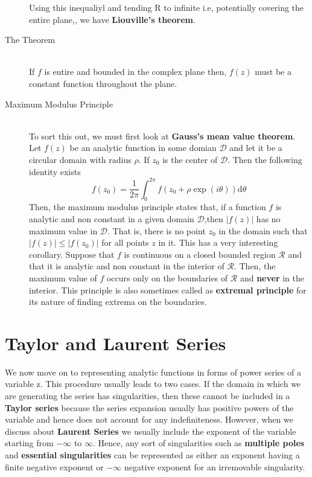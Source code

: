 \documentclass[11pt]{article}
\begin{document}
\begin{sloppypar}
\begin{description}
Using this inequaliyl and tending R to infinite i.e, potentially covering the entire plane,, we have \textbf{Liouville\rq{}s theorem}.

\item[The Theorem] \hfill \\
If $f$ is entire and bounded in the complex plane then, $f(z)$ must be a constant function throughout the plane.

\item[Maximum Modulus Principle] \hfill \\
	To sort this out, we must first look at \textbf{Gauss\rq{}s mean value theorem}. Let $f(z)$ be an analytic function in some domian $\mathcal{D}$ and let it be a circular domain with radius $\rho$. If $z_{0}$ is the center of $\mathcal{D}$. Then the following identity exists
$$f(z_{0}) = \frac{1}{2\pi}\int_0^{2\pi} f(z_{0} + \rho\exp(i\theta))\mathrm{d}\theta$$
	Then, the maximum modulus principle states that, if a function $f$ is analytic and non constant in a given domain $\mathcal{D}$,then $|f(z)|$ has no maximum value in $\mathcal{D}$. That is, there is no point $z_{0}$ in the domain such that $|f(z)| \leq |f(z_{0})|$ for all points $z$ in it.  This has a very interesting corollary. Suppose that $f$ is continuous on a closed bounded region $\mathcal{R}$ and that it is analytic and non constant in the interior of $\mathcal{R}$. Then, the maximum value of $f$ occurs only on the boundaries of $\mathcal{R}$ and \textbf{never} in the interior. This principle is also sometimes called as \textbf{extremal principle} for its nature of finding extrema on the boundaries.
\end{description}
\section{Taylor and Laurent Series}
 We now move on to representing analytic functions in forms of power series of a variable z. This procedure usually leads to two cases. If the domain in which we are generating the series has singularities, then these cannot be included in a \textbf{Taylor series} because the series expansion usually has positive powers of the variable and hence does not account for any indefiniteness. However, when we discuss about \textbf{Laurent Series} we usually include the exponent of the variable starting from $-\infty$ to $\infty$. Hence, any sort of singularities such as \textbf{multiple poles} and \textbf{essential singularities} can be represented as either an exponent having a finite negative exponent or $-\infty$ negative exponent for an irremovable singularity.


\end{sloppypar}
\end{document}
